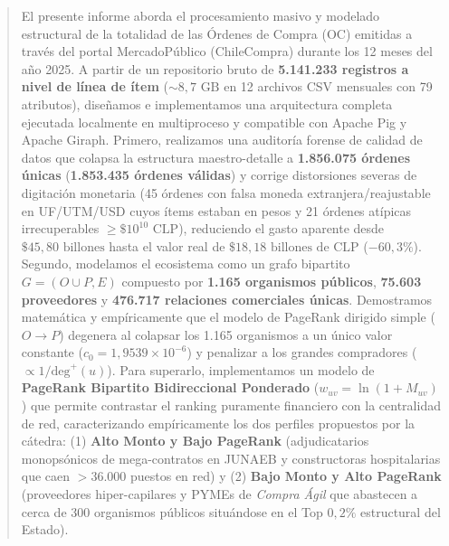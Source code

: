 \documentclass[11pt,a4paper]{article}
\begin{document}
\begin{titlepage}
    \vfill
    \begin{abstract}
    \noindent
    El presente informe aborda el procesamiento masivo y modelado estructural de la totalidad de las Órdenes de Compra (OC) emitidas a través del portal MercadoPúblico (ChileCompra) durante los 12 meses del año 2025. A partir de un repositorio bruto de \textbf{5.141.233 registros a nivel de línea de ítem} ($\sim 8,7\text{ GB}$ en 12 archivos CSV mensuales con 79 atributos), diseñamos e implementamos una arquitectura completa ejecutada localmente en multiproceso y compatible con Apache Pig y Apache Giraph. Primero, realizamos una auditoría forense de calidad de datos que colapsa la estructura maestro-detalle a \textbf{1.856.075 órdenes únicas} (\textbf{1.853.435 órdenes válidas}) y corrige distorsiones severas de digitación monetaria (45 órdenes con falsa moneda extranjera/reajustable en UF/UTM/USD cuyos ítems estaban en pesos y 21 órdenes atípicas irrecuperables $\ge \$10^{10}\text{ CLP}$), reduciendo el gasto aparente desde $\$45,80\text{ billones}$ hasta el valor real de \textbf{$\$18,18\text{ billones de CLP}$} ($-60,3\%$). Segundo, modelamos el ecosistema como un grafo bipartito $G=(O \cup P, E)$ compuesto por \textbf{1.165 organismos públicos}, \textbf{75.603 proveedores} y \textbf{476.717 relaciones comerciales únicas}. Demostramos matemática y empíricamente que el modelo de PageRank dirigido simple ($O \to P$) degenera al colapsar los 1.165 organismos a un único valor constante ($c_0 = 1,9539 \times 10^{-6}$) y penalizar a los grandes compradores ($\propto 1/\text{deg}^+(u)$). Para superarlo, implementamos un modelo de \textbf{PageRank Bipartito Bidireccional Ponderado} ($w_{uv} = \ln(1 + M_{uv})$) que permite contrastar el ranking puramente financiero con la centralidad de red, caracterizando empíricamente los dos perfiles propuestos por la cátedra: (1) \textbf{Alto Monto y Bajo PageRank} (adjudicatarios monopsónicos de mega-contratos en JUNAEB y constructoras hospitalarias que caen $>36.000$ puestos en red) y (2) \textbf{Bajo Monto y Alto PageRank} (proveedores hiper-capilares y PYMEs de \textit{Compra Ágil} que abastecen a cerca de 300 organismos públicos situándose en el Top $0,2\%$ estructural del Estado).
    \end{abstract}
    \vfill
\end{titlepage}

\tableofcontents
\newpage

\end{document}

